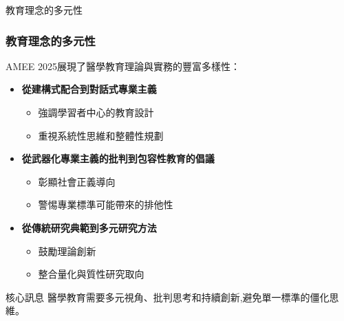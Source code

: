 \documentclass[aspectratio=169]{beamer}
\begin{document}
\begin{frame}{教育理念的多元性}
\frametitle{教育理念的多元性}

AMEE 2025展現了醫學教育理論與實務的豐富多樣性：

\begin{itemize}
    \item \textbf{從建構式配合到對話式專業主義}
    \begin{itemize}
        \item 強調學習者中心的教育設計
        \item 重視系統性思維和整體性規劃
    \end{itemize}
    
    \item \textbf{從武器化專業主義的批判到包容性教育的倡議}
    \begin{itemize}
        \item 彰顯社會正義導向
        \item 警惕專業標準可能帶來的排他性
    \end{itemize}
    
    \item \textbf{從傳統研究典範到多元研究方法}
    \begin{itemize}
        \item 鼓勵理論創新
        \item 整合量化與質性研究取向
    \end{itemize}
\end{itemize}

\vspace{0.5cm}

\begin{alertblock}{核心訊息}
醫學教育需要多元視角、批判思考和持續創新,避免單一標準的僵化思維。
\end{alertblock}
\end{frame}
\end{document}
